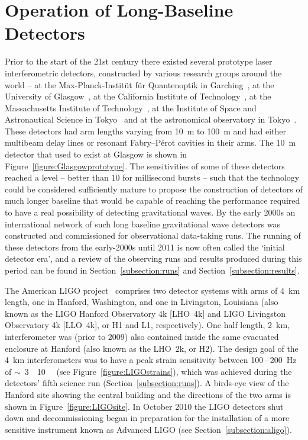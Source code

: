 \section{Operation of Long-Baseline Detectors}
\label{section:construction} 

Prior to the start of the 21st century there existed several prototype laser interferometric detectors, 
constructed by various research groups around the world -- at the Max-Planck-Instit\"ut f\"ur Quantenoptik in
Garching~\cite{Shoemaker}, at the University of Glasgow~\cite{Robertson}, at the California Institute of 
Technology~\cite{Abramovici}, at the Massachusetts Institute of Technology~\cite{Fritschel2}, at the 
Institute of Space and Astronautical Science in Tokyo~\cite{Mizuno} and at the astronomical observatory
in Tokyo~\cite{Araya}. These detectors had arm lengths varying from 10~m to 100~m and had either multibeam 
delay lines or resonant Fabry--P\'{e}rot cavities in their arms. The 10~m detector that used to exist at 
Glasgow is shown in Figure~\ref{figure:Glasgowprototype}. The sensitivities of some of these detectors 
reached a level -- better than 10 for millisecond bursts -- such that the technology could be
considered sufficiently mature to propose the construction of detectors of much longer baseline that would be 
capable of reaching the performance required to have a real possibility of detecting gravitational waves.  By 
the early 2000s an international network of such long baseline gravitational wave detectors was constructed 
and commissioned for observational data-taking runs. The running of these detectors from the early-2000s until
2011 is now often called the `initial detector era', and a review of the observing runs and results produced 
during this period can be found in Section~\ref{subsection:runs} and Section~\ref{subsection:results}.

The American LIGO project~\cite{LIGOweb} comprises two detector systems with arms of 4~km length, one in 
Hanford, Washington, and one in Livingston, Louisiana (also known as the LIGO Hanford Observatory 4k [LHO~4k] 
and LIGO Livingston Observatory 4k [LLO~4k], or H1 and L1, respectively). One half length, 2~km, 
interferometer was (prior to 2009) also contained inside the same evacuated enclosure at Hanford (also known 
as the LHO~2k, or H2). The design goal of the 4~km interferometers was to have a peak strain sensitivity 
between 100\,--\,200~Hz of $\sim$~3~\texttimes~10~\Hz~\cite{LIGOSRD} (see
Figure~\ref{figure:LIGOstrains}), which was achieved during the detectors' fifth science run 
(Section~\ref{subsection:runs}). A birds-eye view of the Hanford site showing the central building and the 
directions of the two arms is shown in Figure~\ref{figure:LIGOsite}. In October 2010 the LIGO detectors shut 
down and decommissioning began in preparation for the installation of a more sensitive instrument known as 
Advanced LIGO (see Section~\ref{subsection:aligo}).

